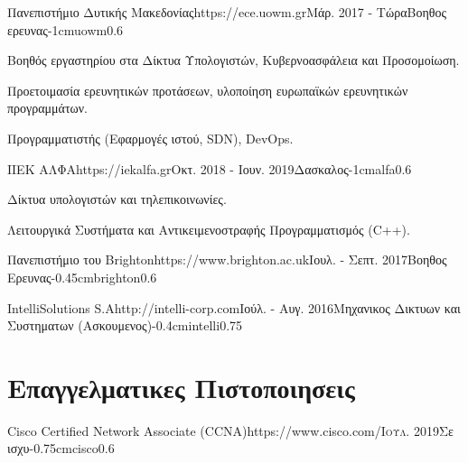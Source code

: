 \documentclass{mycv}
\begin{document}
	\begin{EntryDatedLogo}{Πανεπιστήμιο Δυτικής Μακεδονίας}{https://ece.uowm.gr}{Μάρ. 2017 - Τώρα}{Βοηθος ερευνας}{-1cm}{uowm}{0.6}
		\begin{Itemize}
			\item Βοηθός εργαστηρίου στα Δίκτυα Υπολογιστών, Κυβερνοασφάλεια και Προσομοίωση.
			\item Προετοιμασία ερευνητικών προτάσεων, υλοποίηση ευρωπαϊκών ερευνητικών προγραμμάτων.
			\item Προγραμματιστής (Εφαρμογές ιστού, SDN), DevOps.
		\end{Itemize}
	\end{EntryDatedLogo}
	
	\vspace*{0.5cm}
	
	\begin{EntryDatedLogo}{ΙΙΕΚ ΑΛΦΑ}{https://iekalfa.gr}{Οκτ. 2018 - Ιουν. 2019}{Δασκαλος}{-1cm}{alfa}{0.6}
		\begin{Itemize}
			\item Δίκτυα υπολογιστών και τηλεπικοινωνίες.
			\item Λειτουργικά Συστήματα και Αντικειμενοστραφής Προγραμματισμός (C++).
		\end{Itemize}
	\end{EntryDatedLogo}

	\vspace*{0.5cm}
		
	\begin{EntryDatedLogo}{Πανεπιστήμιο του Brighton}{https://www.brighton.ac.uk}{Ιουλ. - Σεπτ. 2017}{Βοηθος Ερευνας}{-0.45cm}{brighton}{0.6}
	\end{EntryDatedLogo}

	\vspace*{0.75cm}	

	\begin{EntryDatedLogo}{IntelliSolutions S.A}{http://intelli-corp.com}{Ιούλ. - Αυγ. 2016}{Μηχανικος Δικτυων και Συστηματων (Ασκουμενος)}{-0.4cm}{intelli}{0.75}
	\end{EntryDatedLogo}
	\newpage
	
	\section{Επαγγελματικες Πιστοποιησεις}
	\begin{EntryDatedLogo}{Cisco Certified Network Associate (CCNA)}{https://www.cisco.com/}{\scshape{Ιουλ. 2019}}{Σε ισχυ}{-0.75cm}{cisco}{0.6}
	\end{EntryDatedLogo}
	\vspace{0.25cm}
	
\end{document}
